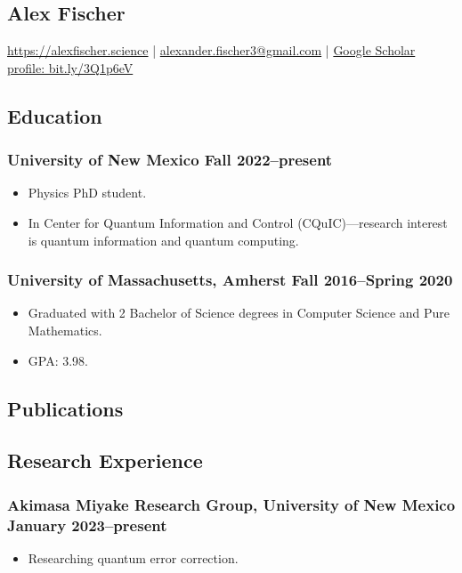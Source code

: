 \documentclass{article}
\begin{document}
	\begin{center}
		\section*{Alex Fischer}
			\href{https://alexfischer.science}{https://alexfischer.science} |
			\href{mailto:alexander.fischer3@gmail.com}{alexander.fischer3@gmail.com} | \href{https://scholar.google.com/citations?user=CfhWaI4AAAAJ&hl=en}{Google Scholar profile: bit.ly/3Q1p6eV}
    \end{center}
	\subsection*{Education}
		\subsubsection*{University of New Mexico \hfill \normalfont \normalsize Fall 2022--present}
			\begin{itemize}
				\item Physics PhD student.
				\item In Center for Quantum Information and Control (CQuIC)---research interest is quantum information and quantum computing.
			\end{itemize}
		\subsubsection*{University of Massachusetts, Amherst \hfill \normalfont \normalsize Fall 2016--Spring 2020}
			\begin{itemize}
				\item Graduated with 2 Bachelor of Science degrees in Computer Science and Pure Mathematics.
				\item GPA: 3.98.
			\end{itemize}
	\subsection*{Publications}
		\nocite{*}
		
		{}
	\subsection*{Research Experience}
		\subsubsection*{Akimasa Miyake Research Group, University of New Mexico \hfill \normalfont \normalsize January 2023--present}
			\begin{itemize}
				\item Researching quantum error correction.
			\end{itemize}
\end{document}
